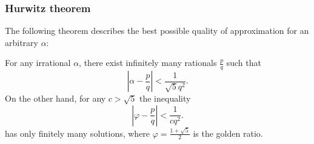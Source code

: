 \begin{frame}
\frametitle{Hurwitz theorem}

The following theorem describes the best possible quality of approximation for an arbitrary $\alpha$:

\begin{theorem}[Hurwitz]
	\label{theorem_hurwitz}
	For any irrational $\alpha$,
	there exist infinitely many rationals $\frac{p}{q}$ such that
	\begin{equation*}
		\label{condition_hurwitz}
		\left| \alpha - \frac{p}{q} \right| < \dfrac{1}{\sqrt{5} q^2}.
	\end{equation*}
	On the other hand, for any $c > \sqrt{5}$ the inequality
	\begin{equation}\label{eq:markov-inequality}
		\left| \varphi - \frac{p}{q} \right| < \dfrac{1}{c q^2}.
	\end{equation}
	has only finitely many solutions,
	where $\varphi = \frac{1 + \sqrt{5}}{2}$
	is the golden ratio.
\end{theorem}

\end{frame}
